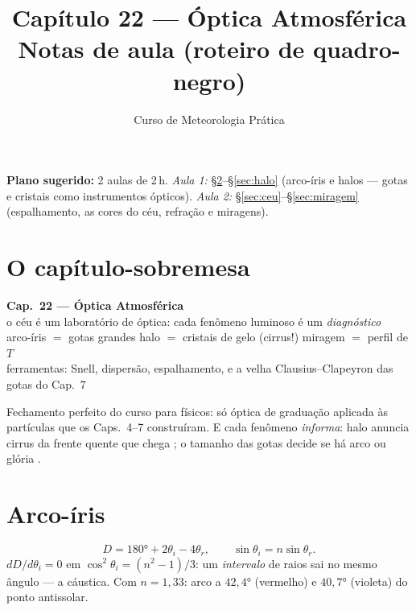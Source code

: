 \documentclass[11pt]{article}
\title{Capítulo 22 --- Óptica Atmosférica\\
{\large Notas de aula (roteiro de quadro-negro)}}
\author{Curso de Meteorologia Prática}
\date{}
\begin{document}
\maketitle
\thispagestyle{fancy}

\noindent\textbf{Plano sugerido:} 2 aulas de 2\,h.
\emph{Aula 1:} \S\ref{sec:arco}--\S\ref{sec:halo} (arco-íris e halos —
gotas e cristais como instrumentos ópticos).
\emph{Aula 2:} \S\ref{sec:ceu}--\S\ref{sec:miragem} (espalhamento, as
cores do céu, refração e miragens).

\section{O capítulo-sobremesa}\label{sec:intro}

\begin{noquadro}[abertura]
\textbf{Cap.~22 --- Óptica Atmosférica}\\[2pt]
o céu é um laboratório de óptica: cada fenômeno luminoso é um
\emph{diagnóstico}\\
arco-íris $=$ gotas grandes \quad halo $=$ cristais de gelo (cirrus!)
\quad miragem $=$ perfil de $T$\\[2pt]
ferramentas: Snell, dispersão, espalhamento, e a velha
Clausius--Clapeyron das gotas do Cap.~7
\end{noquadro}

Fechamento perfeito do curso para físicos: só óptica de graduação
aplicada às partículas que os Caps.~4--7 construíram. E cada fenômeno
\emph{informa}: halo anuncia cirrus da frente quente que chega
; o tamanho das gotas decide
se há arco ou glória .

\section{Arco-íris}\label{sec:arco}


\begin{formadif}
\[ D = 180° + 2\theta_i - 4\theta_r,\qquad
\sin\theta_i = n\sin\theta_r. \]
$dD/d\theta_i = 0$ em $\cos^2\theta_i = (n^2-1)/3$: um
\emph{intervalo} de raios sai no mesmo ângulo — a cáustica. Com
$n = 1{,}33$: arco a $42{,}4°$ (vermelho) e $40{,}7°$ (violeta) do
ponto antissolar.
\end{formadif}
\end{document}
